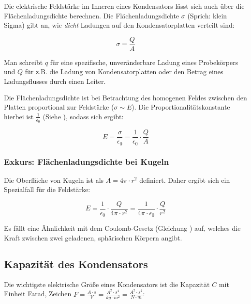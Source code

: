 Die elektrische Feldstärke im Inneren eines Kondensators lässt sich auch über die Flächenladungsdichte berechnen. Die Flächenladungsdichte $\sigma$ (Sprich: \glqq klein Sigma\grqq ) gibt an, wie \emph{dicht} Ladungen auf den Kondensatorplatten verteilt sind:

\begin{equation} \label{eq:flaechenladungsdichte}
	\sigma = \frac{Q}{A}
\end{equation}

\begin{NiceToKnow}
Man schreibt $q$ für eine spezifische, unveränderbare Ladung eines Probekörpers und $Q$ für z.B. die Ladung von Kondensatorplatten oder den Betrag eines Ladungsflusses durch einen Leiter.
\end{NiceToKnow}

Die Flächenladungsdichte ist bei Betrachtung des homogenen Feldes zwischen den Platten proportional zur Feldstärke ($\sigma \sim E$). Die Proportionalitätskonstante hierbei ist $\frac{1}{\epsilon_0}$ (Siehe ), sodass sich ergibt:

\begin{equation} \label{eq:feldstaerke_mit_sigma}
	E = \frac{\sigma}{\epsilon_0} = \frac{1}{\epsilon_0} \cdot \frac{Q}{A}
\end{equation}

\subsubsection{Exkurs: Flächenladungsdichte bei Kugeln}

Die Oberfläche von Kugeln ist als $A=4\pi \cdot r^2$ definiert. Daher ergibt sich ein Spezialfall für die Feldstärke:

\begin{equation} \label{eq:feldstaerke_kugel}
	E = \frac{1}{\epsilon_0} \cdot \frac{Q}{4\pi \cdot r^2} = \frac{1}{4\pi \cdot \epsilon_0} \cdot \frac{Q}{r^2}
\end{equation}

Es fällt eine Ähnlichkeit mit dem Coulomb-Gesetz (Gleichung ) auf, welches die Kraft zwischen zwei geladenen, sphärischen Körpern angibt.


\subsection{Kapazität des Kondensators}

Die wichtigste elektrische Größe eines Kondensators ist die Kapazität $C$ mit Einheit \glqq Farad\grqq{}, Zeichen $F = \frac{A \cdot s}{V} = \frac{A^2 \cdot s^4}{kg \cdot m^2} = \frac{A^2 \cdot s^2}{N \cdot m}$:

